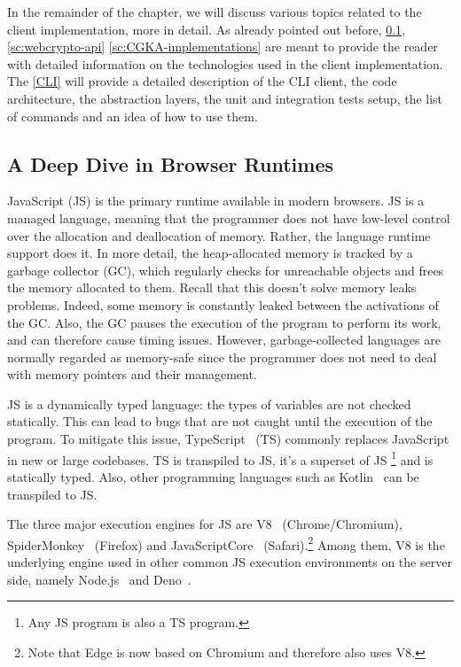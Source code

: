In the remainder of the chapter, we will discuss various topics
related to the client implementation, more in detail.
As already pointed out before, \cref{sc:browser-runtimes}, \cref{sc:webcrypto-api} \cref{sc:CGKA-implementations}
are meant to provide the reader with detailed information 
on the technologies used in the client implementation.
The \cref{CLI} will provide a detailed description of the CLI client,
the code architecture, the abstraction layers, the unit and
integration tests setup, the list of commands and an idea of how
to use them.

\subsection{A Deep Dive in Browser Runtimes}\label{sc:browser-runtimes}

JavaScript (JS) is the primary runtime available in modern browsers.
JS is a managed language, meaning that the programmer
does not have low-level control over the allocation and
deallocation of memory. Rather, the language runtime support does it.
In more detail, the heap-allocated memory
is tracked by a garbage collector (GC), which regularly
checks for unreachable objects and frees the memory allocated
to them. Recall that this doesn't solve memory leaks
problems. Indeed, some memory is constantly leaked
between the activations of the GC. Also, the GC
pauses the execution of the program to perform its work,
and can therefore cause timing issues. However, garbage-collected
languages are normally regarded as memory-safe since
the programmer does not need to deal with memory pointers
and their management.


JS is a dynamically
typed language: the types of variables are not checked
statically. This can lead to bugs that are not caught
until the execution of the program.
To mitigate this issue, TypeScript~\cite{bierman2014understanding} (TS)
commonly replaces JavaScript in new or large codebases.
TS is transpiled to JS, it's a superset of JS
\footnote{Any JS program is also a TS program.}
and is statically typed.
Also, other programming languages such as
Kotlin~\cite{KotlinToJs} can be transpiled to JS.

The three major execution engines for JS are V8~\cite{V8} (Chrome/Chromium),
SpiderMonkey~\cite{SpiderMonkey} (Firefox) and JavaScriptCore~\cite{JavaScriptCore} (Safari).\footnote{Note that Edge is now based on Chromium and therefore
also uses V8.}
Among them, V8 is the underlying engine used in other
common JS execution environments on the server side, 
namely Node.js~\cite{NodeJS} and Deno~\cite{Deno}.


